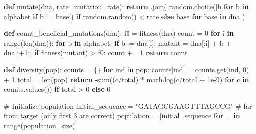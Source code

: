 \documentclass[
  letterpaper,
  DIV=11,
  numbers=noendperiod]{scrreprt}
\newenvironment{Shaded}{\begin{snugshade}}{\end{snugshade}}
\newcommand{\BuiltInTok}[1]{\textcolor[rgb]{0.00,0.23,0.31}{#1}}
\newcommand{\CommentTok}[1]{\textcolor[rgb]{0.37,0.37,0.37}{#1}}
\newcommand{\ControlFlowTok}[1]{\textcolor[rgb]{0.00,0.23,0.31}{\textbf{#1}}}
\newcommand{\DecValTok}[1]{\textcolor[rgb]{0.68,0.00,0.00}{#1}}
\newcommand{\FloatTok}[1]{\textcolor[rgb]{0.68,0.00,0.00}{#1}}
\newcommand{\KeywordTok}[1]{\textcolor[rgb]{0.00,0.23,0.31}{\textbf{#1}}}
\newcommand{\NormalTok}[1]{\textcolor[rgb]{0.00,0.23,0.31}{#1}}
\newcommand{\OperatorTok}[1]{\textcolor[rgb]{0.37,0.37,0.37}{#1}}
\newcommand{\StringTok}[1]{\textcolor[rgb]{0.13,0.47,0.30}{#1}}
\theoremstyle{definition}
\theoremstyle{remark}
\begin{document}
\begin{tcolorbox}
\begin{Shaded}
\begin{Highlighting}[]
\KeywordTok{def}\NormalTok{ mutate(dna, rate}\OperatorTok{=}\NormalTok{mutation\_rate):}
    \ControlFlowTok{return} \StringTok{\textquotesingle{}\textquotesingle{}}\NormalTok{.join(}
\NormalTok{        random.choice([b }\ControlFlowTok{for}\NormalTok{ b }\KeywordTok{in}\NormalTok{ alphabet }\ControlFlowTok{if}\NormalTok{ b }\OperatorTok{!=}\NormalTok{ base]) }\ControlFlowTok{if}\NormalTok{ random.random() }\OperatorTok{\textless{}}\NormalTok{ rate }\ControlFlowTok{else}\NormalTok{ base}
        \ControlFlowTok{for}\NormalTok{ base }\KeywordTok{in}\NormalTok{ dna}
\NormalTok{    )}

\KeywordTok{def}\NormalTok{ count\_beneficial\_mutations(dna):}
\NormalTok{    f0 }\OperatorTok{=}\NormalTok{ fitness(dna)}
\NormalTok{    count }\OperatorTok{=} \DecValTok{0}
    \ControlFlowTok{for}\NormalTok{ i }\KeywordTok{in} \BuiltInTok{range}\NormalTok{(}\BuiltInTok{len}\NormalTok{(dna)):}
        \ControlFlowTok{for}\NormalTok{ b }\KeywordTok{in}\NormalTok{ alphabet:}
            \ControlFlowTok{if}\NormalTok{ b }\OperatorTok{!=}\NormalTok{ dna[i]:}
\NormalTok{                mutant }\OperatorTok{=}\NormalTok{ dna[:i] }\OperatorTok{+}\NormalTok{ b }\OperatorTok{+}\NormalTok{ dna[i}\OperatorTok{+}\DecValTok{1}\NormalTok{:]}
                \ControlFlowTok{if}\NormalTok{ fitness(mutant) }\OperatorTok{\textgreater{}}\NormalTok{ f0:}
\NormalTok{                    count }\OperatorTok{+=} \DecValTok{1}
    \ControlFlowTok{return}\NormalTok{ count}

\KeywordTok{def}\NormalTok{ diversity(pop):}
\NormalTok{    counts }\OperatorTok{=}\NormalTok{ \{\}}
    \ControlFlowTok{for}\NormalTok{ ind }\KeywordTok{in}\NormalTok{ pop:}
\NormalTok{        counts[ind] }\OperatorTok{=}\NormalTok{ counts.get(ind, }\DecValTok{0}\NormalTok{) }\OperatorTok{+} \DecValTok{1}
\NormalTok{    total }\OperatorTok{=} \BuiltInTok{len}\NormalTok{(pop)}
    \ControlFlowTok{return} \OperatorTok{{-}}\BuiltInTok{sum}\NormalTok{((c}\OperatorTok{/}\NormalTok{total) }\OperatorTok{*}\NormalTok{ math.log(c}\OperatorTok{/}\NormalTok{total }\OperatorTok{+} \FloatTok{1e{-}9}\NormalTok{) }\ControlFlowTok{for}\NormalTok{ c }\KeywordTok{in}\NormalTok{ counts.values()) }\ControlFlowTok{if}\NormalTok{ total }\OperatorTok{\textgreater{}} \DecValTok{0} \ControlFlowTok{else} \DecValTok{0}

\CommentTok{\# Initialize population}
\NormalTok{initial\_sequence }\OperatorTok{=} \StringTok{"GATAGCGAAGTTTAGCCG"} \CommentTok{\# far from target (only first 3 are correct)}
\NormalTok{population }\OperatorTok{=}\NormalTok{ [initial\_sequence }\ControlFlowTok{for}\NormalTok{ \_ }\KeywordTok{in} \BuiltInTok{range}\NormalTok{(population\_size)]}


\end{Highlighting}
\end{Shaded}
\end{tcolorbox}
\end{document}
